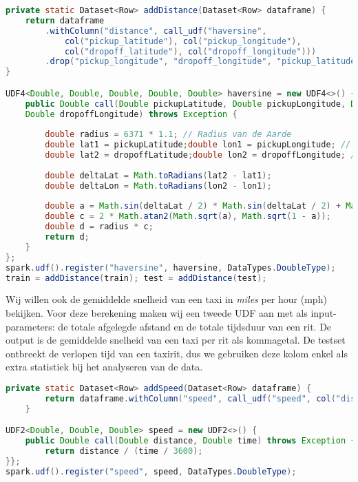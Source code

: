 \documentclass[a4paper,10pt,twoside]{report}
\begin{document}
\begin{lstlisting}[language=Java]
private static Dataset<Row> addDistance(Dataset<Row> dataframe) {
	return dataframe
		.withColumn("distance", call_udf("haversine", 
			col("pickup_latitude"), col("pickup_longitude"), 
			col("dropoff_latitude"), col("dropoff_longitude")))
		.drop("pickup_longitude", "dropoff_longitude", "pickup_latitude", "dropoff_latitude");
}

UDF4<Double, Double, Double, Double, Double> haversine = new UDF4<>() {
	public Double call(Double pickupLatitude, Double pickupLongitude, Double dropoffLatitude,
	Double dropoffLongitude) throws Exception {
		
		double radius = 6371 * 1.1; // Radius van de Aarde
		double lat1 = pickupLatitude;double lon1 = pickupLongitude; // pick-up
		double lat2 = dropoffLatitude;double lon2 = dropoffLongitude; // drop-off
		
		double deltaLat = Math.toRadians(lat2 - lat1);
		double deltaLon = Math.toRadians(lon2 - lon1);
		
		double a = Math.sin(deltaLat / 2) * Math.sin(deltaLat / 2) + Math.cos(Math.toRadians(lat1)) * Math.cos(Math.toRadians(lat2)) * Math.sin(deltaLon / 2) * Math.sin(deltaLon / 2);
		double c = 2 * Math.atan2(Math.sqrt(a), Math.sqrt(1 - a));
		double d = radius * c;
		return d;
	}
};
spark.udf().register("haversine", haversine, DataTypes.DoubleType);
train = addDistance(train); test = addDistance(test);
\end{lstlisting}

Wij willen ook de gemiddelde snelheid van een taxi in \textit{miles} per hour (mph) bekijken. Voor deze berekening maken wij een tweede UDF aan met als input-parameters: de totale afgelegde afstand en de totale tijdsduur van een rit. De output is de gemiddelde snelheid van een taxi per rit als kommagetal. De testset ontbreekt de verlopen tijd van een taxirit, dus we gebruiken deze kolom enkel als extra statistiek bij het analyseren van de data.

\begin{lstlisting}[language=Java]
private static Dataset<Row> addSpeed(Dataset<Row> dataframe) {
		return dataframe.withColumn("speed", call_udf("speed", col("distance"), col(label)));
	}

UDF2<Double, Double, Double> speed = new UDF2<>() {
	public Double call(Double distance, Double time) throws Exception {
		return distance / (time / 3600);
}};
spark.udf().register("speed", speed, DataTypes.DoubleType);

\end{lstlisting}
\end{document}
